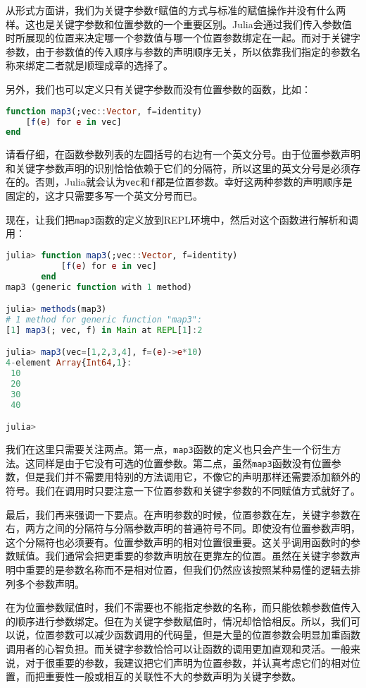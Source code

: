 从形式方面讲，我们为关键字参数\verb|f|赋值的方式与标准的赋值操作并没有什么两样。这也是关键字参数和位置参数的一个重要区别。Julia会通过我们传入参数值时所展现的位置来决定哪一个参数值与哪一个位置参数绑定在一起。而对于关键字参数，由于参数值的传入顺序与参数的声明顺序无关，所以依靠我们指定的参数名称来绑定二者就是顺理成章的选择了。

另外，我们也可以定义只有关键字参数而没有位置参数的函数，比如：

\begin{lstlisting}[language=julia]
function map3(;vec::Vector, f=identity)
    [f(e) for e in vec]
end
\end{lstlisting}

请看仔细，在函数参数列表的左圆括号的右边有一个英文分号。由于位置参数声明和关键字参数声明的识别恰恰依赖于它们的分隔符，所以这里的英文分号是必须存在的。否则，Julia就会认为\verb|vec|和\verb|f|都是位置参数。幸好这两种参数的声明顺序是固定的，这才只需要多写一个英文分号而已。

现在，让我们把\verb|map3|函数的定义放到REPL环境中，然后对这个函数进行解析和调用：

\begin{lstlisting}[language=julia]
julia> function map3(;vec::Vector, f=identity)
           [f(e) for e in vec]
       end
map3 (generic function with 1 method)

julia> methods(map3)
# 1 method for generic function "map3":
[1] map3(; vec, f) in Main at REPL[1]:2

julia> map3(vec=[1,2,3,4], f=(e)->e*10)
4-element Array{Int64,1}:
 10
 20
 30
 40

julia>
\end{lstlisting}

我们在这里只需要关注两点。第一点，\verb|map3|函数的定义也只会产生一个衍生方法。这同样是由于它没有可选的位置参数。第二点，虽然\verb|map3|函数没有位置参数，但是我们并不需要用特别的方法调用它，不像它的声明那样还需要添加额外的符号。我们在调用时只要注意一下位置参数和关键字参数的不同赋值方式就好了。

最后，我们再来强调一下要点。在声明参数的时候，位置参数在左，关键字参数在右，两方之间的分隔符与分隔参数声明的普通符号不同。即使没有位置参数声明，这个分隔符也必须要有。位置参数声明的相对位置很重要。这关乎调用函数时的参数赋值。我们通常会把更重要的参数声明放在更靠左的位置。虽然在关键字参数声明中重要的是参数名称而不是相对位置，但我们仍然应该按照某种易懂的逻辑去排列多个参数声明。

在为位置参数赋值时，我们不需要也不能指定参数的名称，而只能依赖参数值传入的顺序进行参数绑定。但在为关键字参数赋值时，情况却恰恰相反。所以，我们可以说，位置参数可以减少函数调用的代码量，但是大量的位置参数会明显加重函数调用者的心智负担。而关键字参数恰恰可以让函数的调用更加直观和灵活。一般来说，对于很重要的参数，我建议把它们声明为位置参数，并认真考虑它们的相对位置，而把重要性一般或相互的关联性不大的参数声明为关键字参数。


